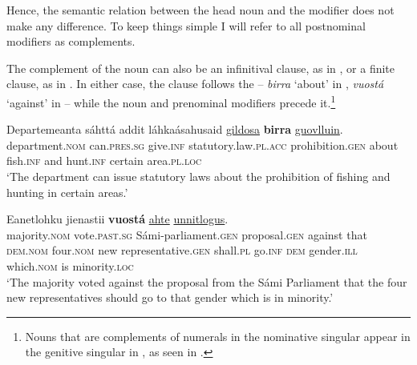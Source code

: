 \documentclass[output=paper]{LSP/langsci}
\begin{document}
Hence, the semantic relation between the head noun and the modifier does not make any difference. To keep things simple I will refer to all postnominal modifiers as complements.

The complement of the noun can also be an infinitival clause, as in , or a finite clause, as in . In either case, the clause follows the  – \textit{birra} ‘about’ in , \textit{vuostá} ‘against’ in  – while the noun and prenominal modifiers precede it.\footnote{Nouns that are complements of numerals in the nominative singular appear in the genitive singular in , as seen in .}

\ea%
    \label{ex:julien:6}
   
    \gll      Departemeanta  sáhttá        addit    láhkaásahusaid      \ul{gildosa}   \textbf{birra}                    \uline{guovlluin}.\\ 
    department.\textsc{nom}  can.\textsc{pres.sg}  give.\textsc{inf}  statutory.law.\textsc{pl.acc}    prohibition.\textsc{gen}    about    fish.\textsc{inf}    and  hunt.\textsc{inf}  certain  area.\textsc{pl}.\textsc{loc}\\
    \glt  ‘The department can issue statutory laws about the prohibition of fishing and hunting in certain areas.’
    \z

\ea%
    \label{ex:julien:7}
   
    \gll    Eanetlohku    jienastii                    \textbf{vuostá}     \uline{ahte}                                               \uline{unnitlogus}.\\ 
	    majority.\textsc{nom}  vote.\textsc{past.sg}  Sámi-parliament.\textsc{gen}  proposal.\textsc{gen}  against    that  \textsc{dem.nom}  four.\textsc{nom}  new  representative.\textsc{gen}  shall.\textsc{pl}  go.\textsc{inf}   \textsc{dem} {gender}.\textsc{ill} which.\textsc{nom}  is    minority.\textsc{loc}\\
    \glt  ‘The majority voted against the proposal from the Sámi Parliament that the four new representatives should go to that {gender} which is in minority.’
    \z
\end{document}
